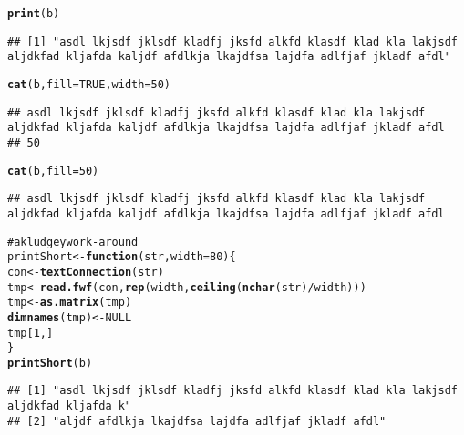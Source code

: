 \documentclass{article}\usepackage{graphicx, color}
\makeatletter
\newcommand{\hlfunctioncall}[1]{\textcolor[rgb]{0.501960784313725,0,0.329411764705882}{\textbf{#1}}}%
\newcommand{\hlcomment}[1]{\textcolor[rgb]{0.180392156862745,0.6,0.341176470588235}{#1}}%
\newenvironment{kframe}{%
 \def\at@end@of@kframe{}%
 \ifinner\ifhmode%
  \def\at@end@of@kframe{\end{minipage}}%
  \begin{minipage}{\columnwidth}%
 \fi\fi%
 \def\FrameCommand##1{\hskip\@totalleftmargin \hskip-\fboxsep
 \colorbox{shadecolor}{##1}\hskip-\fboxsep
     \hskip-\linewidth \hskip-\@totalleftmargin \hskip\columnwidth}%
 \MakeFramed {\advance\hsize-\width
   \@totalleftmargin\z@ \linewidth\hsize
   \@setminipage}}%
 {\par\unskip\endMakeFramed%
 \at@end@of@kframe}
\newenvironment{knitrout}{}{} %
\makeatother
\begin{document}
\begin{knitrout}
\color{fgcolor}\begin{kframe}
\begin{alltt}
\hlfunctioncall{print}(b)
\end{alltt}
\begin{verbatim}
## [1] "asdl lkjsdf jklsdf kladfj jksfd alkfd klasdf klad kla lakjsdf aljdkfad kljafda kaljdf afdlkja lkajdfsa lajdfa adlfjaf jkladf afdl"
\end{verbatim}
\begin{alltt}
\hlfunctioncall{cat}(b, fill = TRUE, width = 50)
\end{alltt}
\begin{verbatim}
## asdl lkjsdf jklsdf kladfj jksfd alkfd klasdf klad kla lakjsdf aljdkfad kljafda kaljdf afdlkja lkajdfsa lajdfa adlfjaf jkladf afdl 
## 50
\end{verbatim}
\begin{alltt}
\hlfunctioncall{cat}(b, fill = 50)
\end{alltt}
\begin{verbatim}
## asdl lkjsdf jklsdf kladfj jksfd alkfd klasdf klad kla lakjsdf aljdkfad kljafda kaljdf afdlkja lkajdfsa lajdfa adlfjaf jkladf afdl
\end{verbatim}
\begin{alltt}

\hlcomment{# a kludgey work-around}
printShort <- \hlfunctioncall{function}(str, width = 80) \{
    con <- \hlfunctioncall{textConnection}(str)
    tmp <- \hlfunctioncall{read.fwf}(con, \hlfunctioncall{rep}(width, \hlfunctioncall{ceiling}(\hlfunctioncall{nchar}(str)/width)))
    tmp <- \hlfunctioncall{as.matrix}(tmp)
    \hlfunctioncall{dimnames}(tmp) <- NULL
    tmp[1, ]
\}
\hlfunctioncall{printShort}(b)
\end{alltt}
\begin{verbatim}
## [1] "asdl lkjsdf jklsdf kladfj jksfd alkfd klasdf klad kla lakjsdf aljdkfad kljafda k"
## [2] "aljdf afdlkja lkajdfsa lajdfa adlfjaf jkladf afdl"
\end{verbatim}
\begin{alltt}


\end{alltt}
\end{kframe}
\end{knitrout}
\end{document}
